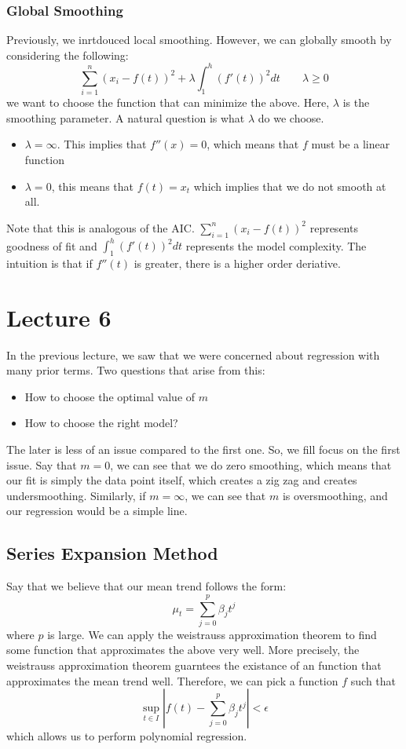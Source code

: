 \documentclass[12pt]{article}
\begin{document}
\subsubsection{Global Smoothing}
Previously, we inrtdouced local smoothing. However, we can globally smooth by considering the following:
\[
	\sum_{i=1}^n (x_i - f(t))^2 + \lambda \int_1^h (f'(t))^2 dt \qquad \lambda \geq 0
\]
we want to choose the function that can minimize the above. Here, $\lambda$ is the smoothing parameter. A natural question is what $\lambda$ do we choose. 
\begin{itemize}
	\item $\lambda = \infty$. This implies that $f''(x) = 0$, which means that $f$ must be a linear function 
	\item $\lambda = 0 $, this means that $f(t) = x_t$ which implies that we do not smooth at all.
\end{itemize}
Note that this is analogous of the AIC. $\sum_{i=1}^n (x_i - f(t))^2$ represents goodness of fit and $\int_1^h (f'(t))^2 dt$ represents the model complexity. The intuition is that if $f''(t)$ is greater, there is a higher order deriative. 
\section{Lecture 6}
In the previous lecture, we saw that we were concerned about regression with many prior terms. Two questions that arise from this:
\begin{itemize}
	\item How to choose the optimal value of $m$
	\item How to choose the right model? 
\end{itemize}
The later is less of an issue compared to the first one. So, we fill focus on the first issue. Say that $m = 0$, we can see that we do zero smoothing, which means that our fit is simply the data point itself, which creates a zig zag and creates undersmoothing. Similarly, if $m = \infty$, we can see that $m$ is oversmoothing, and our regression would be a simple line. 
\subsection{Series Expansion Method}
Say that we believe that our mean trend follows the form:
\[
	\mu_t = \sum_{j = 0}^p \beta_j t^j 
\]
where $p$ is large. We can apply the weistrauss approximation theorem to find some function that approximates the above very well. More precisely, the weistrauss approximation theorem guarntees the existance of an function that approximates the mean trend well. Therefore, we can pick a function $f$ such that 
\[
	\sup_{t \in I} | f(t) -  \sum_{j = 0}^p \beta_j t^j | < \epsilon 
\]
which allows us to perform polynomial regression. 
\end{document}
